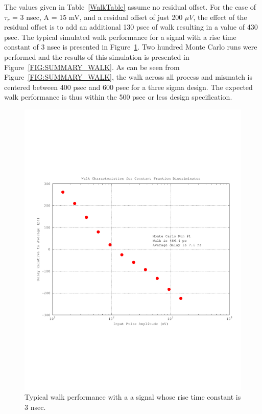 \documentclass[12pt,oneside,final]{siuethesis}
\theoremstyle{definition}
\begin{document}
\par The values given in Table~\ref{WalkTable} assume no residual offset.  For the case of $\tau_r$ = 3 nsec, A = 15 mV, and a residual offset of just 200 $\mu V$, the effect of the residual offset is to add an additional 130 psec of walk resulting in a value of 430 psec. The typical simulated walk performance for a signal with a rise time constant of 3 nsec is presented in Figure~\ref{FIG:TYPICAL_WALK}.  Two hundred Monte Carlo runs were performed and the results of this simulation is presented in Figure~\ref{FIG:SUMMARY_WALK}. As can be seen from Figure~\ref{FIG:SUMMARY_WALK}, the walk across all process and mismatch is centered between 400 psec and 600 psec for a three sigma design. The expected walk performance is thus within the 500 psec or less design specification.

\begin{figure}[htbp!]
	\centering
 	\includegraphics[scale=0.7,keepaspectratio=true]{../Design_Reports/CFD_circuit_report/images/typical_walk.pdf} 	
 	\caption{Typical walk performance with a a signal whose rise time constant is 3 nsec.}
 	\label{FIG:TYPICAL_WALK}
\end{figure}
\end{document}
